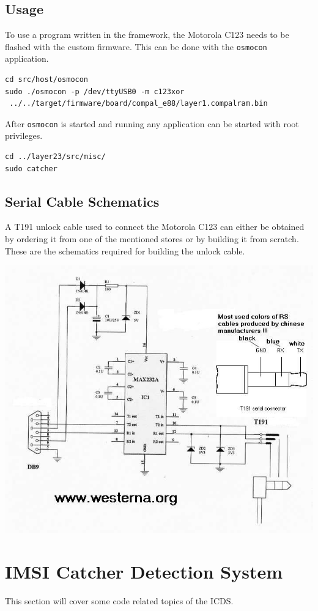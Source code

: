 \section{Usage}
\label{sec:osmo_usage}
To use a program written in the framework, the Motorola C123 needs to be flashed with the custom firmware.
This can be done with the \texttt{osmocon} application. 
\begin{lstlisting}
cd src/host/osmocon
sudo ./osmocon -p /dev/ttyUSB0 -m c123xor
 ../../target/firmware/board/compal_e88/layer1.compalram.bin
\end{lstlisting}
After \texttt{osmocon} is started and running any application can be started with root privileges.
\begin{lstlisting}
cd ../layer23/src/misc/
sudo catcher
\end{lstlisting}
\newpage
\section{Serial Cable Schematics}
\label{sec:osmo_serial_schematics}
A T191 unlock cable used to connect the Motorola C123 can either be obtained by ordering it from one of the mentioned stores or by building it from scratch.
These are the schematics required for building the unlock cable.
\vfill
\begin{center}
\includegraphics[width=.9\textwidth]{../Images/t191cable}
\end{center}
\vfill
\chapter{IMSI Catcher Detection System}
This section will cover some code related topics of the ICDS.
